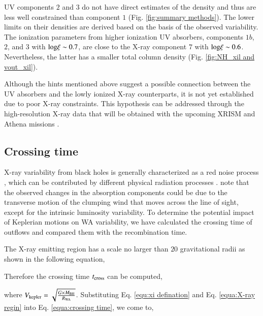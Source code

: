 \documentclass{aa}
\begin{document}
UV components $2$ and $3$ do not have direct estimates of the density and thus are less well constrained than component $1$ (Fig. \ref{fig:summary methods}). 
The lower limits on their densities are derived based on the basis of the observed variability. 
The ionization parameters from higher ionization UV absorbers, components $1b$, $2$, and $3$ with $\rm log \xi \sim 0.7$, are close to the X-ray component $7$ with $\rm log \xi \sim 0.6$.
Nevertheless, the latter has a smaller total column density (Fig. \ref{fig:NH_xil and vout_xil}).


%


Although the hints mentioned above suggest a possible connection between the UV absorbers and the lowly ionized X-ray counterparts, it is not yet established due to poor X-ray constraints.
This hypothesis can be addressed through the high-resolution X-ray data that will be obtained with the upcoming XRISM \citep{XRISM2022arXiv220205399X} and Athena missions \citep{Nandra2013arXiv1306.2307N}.






\subsection{Crossing time}
X-ray variability from black holes is generally characterized as a red noise process \citep{Uttley2014A&ARv}, which can be contributed by different physical radiation 
processes \citep{Edward2021iScience}. 
\cite{Gabel2003ApJ} note that the observed changes in the absorption components could be due to the transverse motion of the clumping wind that moves across the line of sight, except for the intrinsic luminosity variability.
To determine the potential impact of Keplerian motions on WA variability, we have calculated the crossing time of outflows and compared them with the recombination time.



The X-ray emitting region has a scale no larger than $20$ gravitational radii \citep{Reis2013ApJL} as shown in the following equation,

Therefore the crossing time $t_{\rm cross}$ can be computed,

where $V_{\rm kepler} = \sqrt{\frac{G \times M_{\rm BH}}{R_{\rm WA}}}$. 
Substituting Eq. \ref{equ:xi defination} and Eq. \ref{equa:X-ray regin} into Eq. \ref{equa:crossing time}, we come to,
\end{document}
